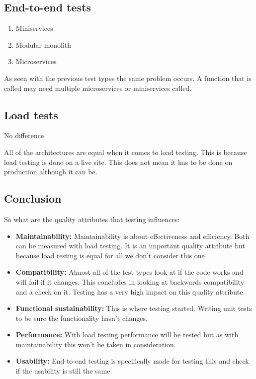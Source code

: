 \subsection{End-to-end tests}

\begin{enumerate}
        \item Miniservices
        \item Modular monolith
        \item Microservices
\end{enumerate}

As seen with the previous test types the same problem occurs. A function that is called may need multiple microservices or miniservices called.

\subsection{Load tests}

No difference

All of the architectures are equal when it comes to load testing. This is because load testing is done on a live site. This does not mean it has to be done on production although it can be.

\subsection{Conclusion}

So what are the quality attributes that testing influences:

\begin{itemize}
        \item \textbf{Maintainability:} Maintainability is about effectiveness and efficiency. Both can be measured with load testing. It is an important quality attribute but because load testing is equal for all we don’t consider this one

        \item \textbf{Compatibility:} Almost all of the test types look at if the code works and will fail if it changes. This concludes in looking at backwards compatibility and a check on it. Testing has a very high impact on this quality attribute.
 
        \item \textbf{Functional sustainability:} This is where testing started. Writing unit tests to be sure the functionality hasn’t changes.
 
        \item \textbf{Performance:} With load testing performance will be tested but as with maintainability this won’t be taken in consideration.
 
        \item \textbf{Usability:} End-to-end testing is specifically made for testing this and check if the usability is still the same. 
\end{itemize}

